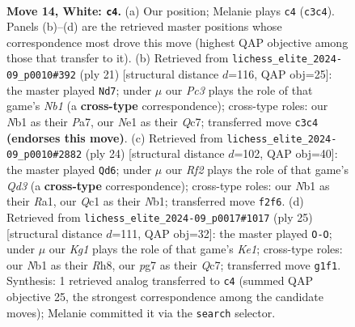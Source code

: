 \documentclass[11pt]{article}
\begin{document}
\begin{figure}[p]\centering
\begin{subfigure}{0.46\textwidth}\centering
\resizebox{\linewidth}{!}{%
\newchessgame
\chessboard[
  setfen={r1bq2k1/p3rppp/1n2pn2/2pp4/8/2PBP1P1/PP3RPP/RNQ1N1K1 w - - 6 14},
  showmover=false,
  pgfstyle=straightmove, color=movearrow, markmove={c3-c4}
]}
\caption{}
\end{subfigure}\hfill
\begin{subfigure}{0.46\textwidth}\centering
\resizebox{\linewidth}{!}{%
\newchessgame
\chessboard[
  setfen={rnb1r1k1/ppq2pp1/2pb1p2/7p/3P4/2PB3P/PPQ1NPP1/R1B2RK1 b - - 0 11},
  showmover=false,
  pgfstyle=straightmove, color=movearrow, markmove={b8-d7}
]}
\caption{}
\end{subfigure}
\\[4pt]
\begin{subfigure}{0.46\textwidth}\centering
\resizebox{\linewidth}{!}{%
\newchessgame
\chessboard[
  setfen={r1b1k2r/p1qnnpbp/1pp3p1/4p3/2P1P3/3Q1NPB/PP3P1P/RNBR2K1 w kq - 6 13},
  showmover=false,
  pgfstyle=straightmove, color=movearrow, markmove={d3-d6}
]}
\caption{}
\end{subfigure}\hfill
\begin{subfigure}{0.46\textwidth}\centering
\resizebox{\linewidth}{!}{%
\newchessgame
\chessboard[
  setfen={r3k2r/2q2ppp/n1pbpn2/p2p4/N2P4/4PN2/PP1BQPPP/R4RK1 b kq - 1 13},
  showmover=false,
  pgfstyle=straightmove, color=movearrow, markmove={e8-g8}
]}
\caption{}
\end{subfigure}
\caption{\textbf{Move 14, White: \texttt{c4}.} (a) Our position; Melanie plays \texttt{c4} (\texttt{c3c4}). Panels (b)--(d) are the retrieved master positions whose correspondence most drove this move (highest QAP objective among those that transfer to it). (b) Retrieved from \texttt{lichess\_elite\_2024-09\_p0010\#392} (ply 21) [structural distance $d$=116, QAP obj=25]: the master played \texttt{Nd7}; under $\mu$ our \emph{Pc3} plays the role of that game's \emph{Nb1} (a \textbf{cross-type} correspondence); cross-type roles: our \emph{N}b1 as their \emph{P}a7, our \emph{N}e1 as their \emph{Q}c7; transferred move \texttt{c3c4} \textbf{(endorses this move)}. (c) Retrieved from \texttt{lichess\_elite\_2024-09\_p0010\#2882} (ply 24) [structural distance $d$=102, QAP obj=40]: the master played \texttt{Qd6}; under $\mu$ our \emph{Rf2} plays the role of that game's \emph{Qd3} (a \textbf{cross-type} correspondence); cross-type roles: our \emph{N}b1 as their \emph{R}a1, our \emph{Q}c1 as their \emph{N}b1; transferred move \texttt{f2f6}. (d) Retrieved from \texttt{lichess\_elite\_2024-09\_p0017\#1017} (ply 25) [structural distance $d$=111, QAP obj=32]: the master played \texttt{O-O}; under $\mu$ our \emph{Kg1} plays the role of that game's \emph{Ke1}; cross-type roles: our \emph{N}b1 as their \emph{R}h8, our \emph{p}g7 as their \emph{Q}c7; transferred move \texttt{g1f1}. Synthesis: 1 retrieved analog transferred to \texttt{c4} (summed QAP objective 25, the strongest correspondence among the candidate moves); Melanie committed it via the \texttt{search} selector.}
\label{fig:thought-m26}
\end{figure}
\end{document}
